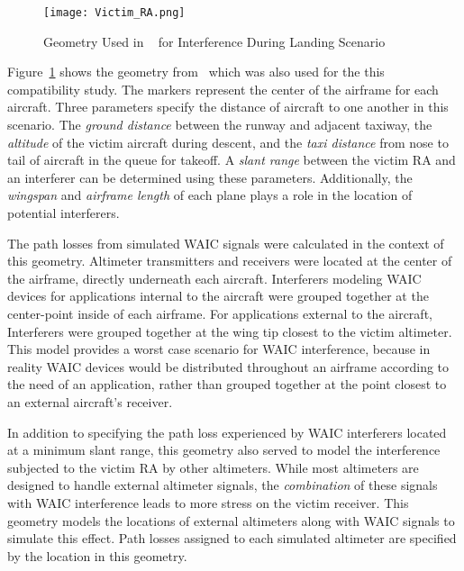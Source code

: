 \begin{figure}[ht]
\centering
\texttt{[image: Victim\_RA.png]}
\caption[]{Geometry Used in ~\cite{noauthor_compatibility_2014} for Interference During Landing Scenario}

\label{fig:victim_ra}

\end{figure}

Figure~\ref{fig:victim_ra} shows the geometry from~\cite{noauthor_compatibility_2014} which was also used for the this compatibility study. The markers represent the center of the airframe for each aircraft. Three parameters specify the distance of aircraft to one another in this scenario. The \textit{ground distance} between the runway and adjacent taxiway, the \textit{altitude} of the victim aircraft during descent, and the \textit{taxi distance} from nose to tail of aircraft in the queue for takeoff. A \textit{slant range} between the victim RA and an interferer can be determined using these parameters. Additionally, the \textit{wingspan} and \textit{airframe length} of each plane plays a role in the location of potential interferers.

The path losses from simulated WAIC signals were calculated in the context of this geometry. Altimeter transmitters and receivers were located at the center of the airframe, directly underneath each aircraft. Interferers modeling WAIC devices for applications internal to the aircraft were grouped together at the center-point inside of each airframe. For applications external to the aircraft, Interferers were grouped together at the wing tip closest to the victim altimeter. This model provides a worst case scenario for WAIC interference, because in reality WAIC devices would be distributed throughout an airframe according to the need of an application, rather than grouped together at the point closest to an external aircraft's receiver. 
%	

In addition to specifying the path loss experienced by WAIC interferers located at a minimum slant range, this geometry also served to model the interference subjected to the victim RA by other altimeters. While most altimeters are designed to handle external altimeter signals, the \textit{combination} of these signals with WAIC interference leads to more stress on the victim receiver. This geometry models the locations of external altimeters along with WAIC signals to simulate this effect. Path losses assigned to each simulated altimeter are specified by the location in this geometry. 
